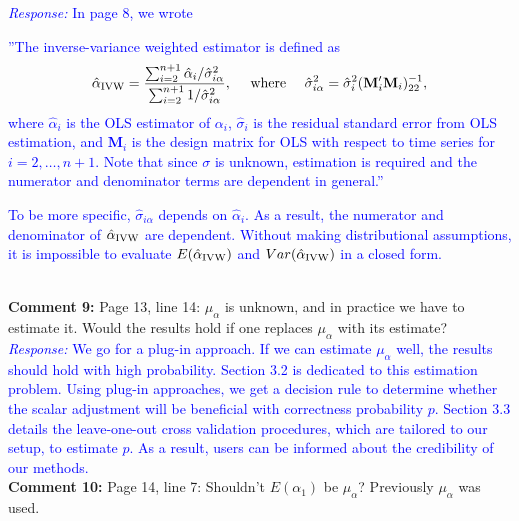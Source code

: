\documentclass[12pt]{article}
\newcommand{\response}[1]{\noindent \textcolor{blue}{\emph{Response:} #1}}
\begin{document}
\response{In page 8, we wrote \\
\begin{tcolorbox}
''The inverse-variance weighted estimator is defined as 
\begin{align*}
  \hat{\alpha}_{\rm IVW} = \frac{\sum_{i=2}^{n+1} \hat{\alpha}_i / \hat{\sigma}_{i\alpha}^2}{\sum_{i=2}^{n+1} 1/\hat{\sigma}_{i\alpha}^2},
  \quad \text{ where } \quad  \hat{\sigma}_{i\alpha}^2 = \hat{\sigma}^2_i( \mathbf{M}_i'\mathbf{M}_i)_{22}^{-1},
\end{align*}
where  $\hat{\alpha}_i$ is the OLS estimator of $\alpha_i$, 
$\hat{\sigma}_i$ is the residual standard error from OLS estimation, 
and $\mathbf{M}_i$ is the design matrix for OLS with respect to time series 
for $i = 2, \ldots, n+1$. Note that since $\sigma$ is unknown, estimation 
is required and the numerator and denominator terms are dependent in general.''
\end{tcolorbox}
To be more specific, $\hat{\sigma}_{i\alpha}$ depends on $\hat{\alpha}_i$. As a result, the numerator and denominator of $ \hat{\alpha}_{\rm IVW}$ are dependent. Without making distributional assumptions, it is impossible to evaluate $E(\hat{\alpha}_{\rm IVW})$ and $Var(\hat{\alpha}_{\rm IVW})$ in a closed form.}\\

{\bf Comment 9:} Page 13, line 14: $\mu_{\alpha}$ is unknown, and in practice we have to estimate it. Would the results hold if one replaces $\mu_{\alpha}$ with its estimate? \\

\response{We go for a plug-in approach. If we can estimate $\mu_{\alpha}$ well, the results should hold with high probability. Section 3.2 is dedicated to this estimation problem. Using plug-in approaches, we get a decision rule to determine whether the scalar adjustment will be beneficial with correctness probability $p$. Section 3.3 details the leave-one-out cross validation procedures, which are tailored to our setup, to estimate $p$. As a result, users can be informed about the credibility of our methods.} \\


{\bf Comment 10:} Page 14, line 7: Shouldn’t $E(\alpha_1)$ be $\mu_{\alpha}$? Previously $\mu_{\alpha}$ was used.\\
\end{document}
